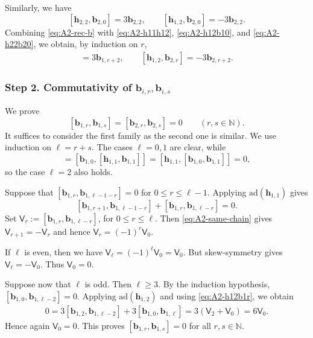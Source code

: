 \documentclass[11pt,reqno]{amsart}
\numberwithin{equation}{section}
\theoremstyle{definition}
\theoremstyle{remark}
\newcommand{\bN}{\mathbb{N}}
\newcommand{\bb}{\mathbf{b}}
\newcommand{\bh}{\mathbf{h}}
\newcommand{\gge}{\geqslant}
\newcommand{\lle}{\leqslant}
\newcommand{\ad}{\mathrm{ad}}
\begin{document}
Similarly, we have 
\begin{equation}\label{eq:A2-h22b20}
[\bh_{2,2},\bb_{2,0}]
=
3\bb_{2,2},\qquad [\bh_{1,2},\bb_{2,0}]
=
-3\bb_{2,2}.
\end{equation}
Combining \eqref{eq:A2-rec-b}  with
\eqref{eq:A2-h11h12},
\eqref{eq:A2-h12b10},
and
\eqref{eq:A2-h22b20}, we obtain, by induction on $r$,
\begin{align}
[\bh_{1,2},\bb_{1,r}]
=
3\bb_{1,r+2},
\label{eq:A2-h12b1r}
\qquad 
[\bh_{1,2},\bb_{2,r}]
=
-3\bb_{2,r+2}.
\end{align}

\subsubsection*{Step 2. Commutativity of $\bb_{i,r},\bb_{i,s}$}
We prove
\begin{equation}\label{eq:A2-same-sign}
[\bb_{1,r},\bb_{1,s}]
=
[\bb_{2,r},\bb_{2,s}]
=
0
\qquad
(r,s\in\bN).
\end{equation}
It suffices to consider the first family as the second one is similar.  We use induction on
$\ell=r+s$.  The cases $\ell=0,1$ are clear, while
\begin{equation*}
[\bb_{1,0},\bb_{1,2}]
=
[\bb_{1,0},[\bh_{1,1},\bb_{1,1}]]
=
[\bh_{1,1},[\bb_{1,0},\bb_{1,1}]]
=0,
\end{equation*}
so the case $\ell=2$ also holds.

Suppose that $[\bb_{1,r},\bb_{1,\ell-1-r}]=0$ for $0\lle r\lle \ell-1$. Applying $\ad(\bh_{1,1})$ gives
\begin{equation}\label{eq:A2-same-chain}
[\bb_{1,r+1},\bb_{1,\ell-1-r}]
+
[\bb_{1,r},\bb_{1,\ell-r}]
=
0.
\end{equation}
Set $\mathsf V_r:=
[\bb_{1,r},\bb_{1,\ell-r}]$, for $0\lle r\lle \ell$. Then \eqref{eq:A2-same-chain} gives
$\mathsf V_{r+1}=-\mathsf V_r$ and hence $
\mathsf V_r=(-1)^r\mathsf V_0$.

If $\ell$ is 
even, then we have $\mathsf V_\ell=(-1)^\ell\mathsf V_0=\mathsf V_0$. But skew-symmetry gives $\mathsf V_\ell=-\mathsf V_0$. Thus $\mathsf V_0=0$.

Suppose now that $\ell $ is odd.  Then $\ell\gge3$.  By the induction
hypothesis, $[\bb_{1,0},\bb_{1,\ell-2}]=0$. Applying $\ad(\bh_{1,2})$ and using
\eqref{eq:A2-h12b1r}, we obtain
\begin{align*}
0
=
3[\bb_{1,2},\bb_{1,\ell-2}]
+
3[\bb_{1,0},\bb_{1,\ell}]
=
3(\mathsf V_2+\mathsf V_0)
=
6\mathsf V_0.
\end{align*}
Hence again $\mathsf V_0=0$. This proves $[\bb_{1,r},\bb_{1,s}]=0$ for all $r,s\in\bN$.
\end{document}
